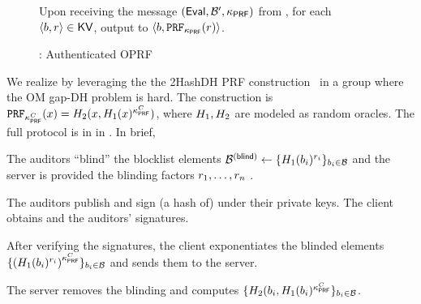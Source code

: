 \begin{figure}
\begin{mdframed}



\enumListEnd

\item Upon receiving the message $(\evaluate, \blocklist', \prfKey)$ from \client, for each $\langle \genericBlocklistElmt, \genericRand \rangle \in \kvs$, output to \server $\langle \genericBlocklistElmt, \prf{\prfKey}(\genericRand)\rangle$. 

\itemListEnd
\end{mdframed}
\caption{\authOPRFFunc: Authenticated OPRF\label{fig:authOPRF_func}}
\end{figure}

%
We realize \authOPRFFunc by leveraging the the 2HashDH PRF construction~\cite{jarecki2014round} in a group where the OM gap-DH problem is hard. The construction is $\prf{\prfKeyClient}(\genericFnInput) = \oprfRO[2](\genericFnInput, \oprfRO[1](\genericFnInput)^{\prfKeyClient})$, where $\oprfRO[1], \oprfRO[2]$ are modeled as random oracles. The full protocol is in  in . In brief,

\enumListStart
\item The auditors ``blind'' the blocklist elements $\blindedBlocklist \assign \{ \oprfRO[1](\genericBlocklistElmt[\setIdx])^{\oprfBlindingFactor[\setIdx]}\}_{\genericBlocklistElmt[\setIdx] \in \blocklist}$ and the server is provided the blinding factors $\oprfBlindingFactor[1], \dots, \oprfBlindingFactor[\blocklistSize]$ . 
\item The auditors publish \blindedBlocklist and sign (a hash of) \blindedBlocklist under their private keys. The client obtains \blindedBlocklist and the auditors' signatures. 
\item After verifying the signatures, the client exponentiates the blinded elements $\{ \left(\oprfRO[1](\genericBlocklistElmt[\setIdx])^{\oprfBlindingFactor[\setIdx]}\right)^{\prfKeyClient}\}_{\genericBlocklistElmt[\setIdx] \in \blocklist}$ and sends them to the server. 
\item The server removes the blinding and computes $\{ \oprfRO[2](\genericBlocklistElmt[\setIdx], \oprfRO[1](\genericBlocklistElmt[\setIdx])^{\prfKeyClient}\}_{\genericBlocklistElmt[\setIdx] \in \blocklist}$. 
\enumListEnd



